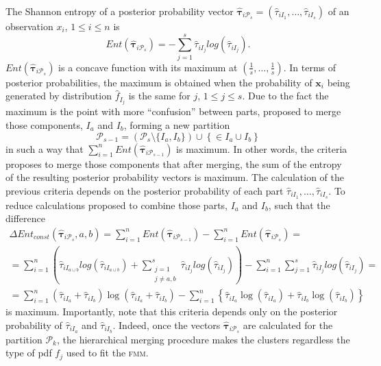 \documentclass[10pt, a4paper]{article}
\newcommand{\m}[1]{\boldsymbol{#1}}
\newcommand{\fmm}{\textsc{fmm}\xspace}
\begin{document}
\begin{spacing}{1.9}
The Shannon entropy of a posterior probability vector $\hat{\m\tau}_{i \mathcal{P}_s} = \left( \hat{\tau}_{i I_1} , \dots, \hat{\tau}_{i I_s}  \right)$ of an observation $x_i$, $1 \leq i \leq n$ is
\[
Ent( \hat{\m \tau}_{i \mathcal{P}_s} ) = - \sum_{j=1}^s \hat{\tau}_{i I_j}  log(\hat{\tau}_{i I_j} ).
\]
$Ent( \hat{\m \tau}_{i \mathcal{P}_s} )$ is a concave function with its maximum at $(\frac{1}{s},\dots,\frac{1}{s})$. In terms of posterior probabilities, the maximum is obtained when the probability of $\m x_i$ being generated by distribution $\hat{f}_{I_j}$ is the same for $j$, $1\leq j \leq s$. Due to the fact the maximum is the point with more ``confusion'' between parts, \cite{baudry2010combining} proposed to merge those components, $I_a$ and $I_b$, forming a new partition\[ \mathcal{P}_{s-1} = \left( \mathcal{P}_s \setminus \{ I_a, I_b \} \right) \cup \left\{ \in I_a\cup I_b \right\} \] in such a way that $\sum_{i=1}^n Ent( \hat{\m \tau}_{i \mathcal{P}_{s-1}} )$ is maximum. In other words, the criteria proposes to merge those components that after merging, the sum of the entropy of the resulting posterior probability vectors is maximum. The calculation of the previous criteria depends on the posterior probability of each part $\hat{\tau}_{i I_1}, \dots,\hat{\tau}_{i I_s}$. To reduce calculations \cite{baudry2010combining} proposed to combine those parts, $I_a$ and $I_b$, such that the difference
\begin{multline*}
\Delta Ent_{const}(\hat{\m \tau}_{i \mathcal{P}_s}, a, b) = \sum_{i=1}^n Ent( \hat{\m \tau}_{i \mathcal{P}_{s-1}}) - \sum_{i=1}^n Ent( \hat{\m \tau}_{i \mathcal{P}_s}) =  \\ = \sum_{i=1}^n  \left( \hat{\tau}_{i I_{a\cup b}}  log(\hat{\tau}_{i I_{a\cup b}} ) +  \sum_{\substack{j=1 \\
                                                            j \neq a, b}}^s \hat{\tau}_{i I_j}  log(\hat{\tau}_{i I_j} ) \right)  - \sum_{i=1}^n \sum_{j=1}^s \hat{\tau}_{i I_j}  log(\hat{\tau}_{i I_j} ) = \\  =   \sum_{i=1}^n  (\hat{\tau}_{i I_a}+\hat{\tau}_{i I_b}) \log(\hat{\tau}_{iI_a} + \hat{\tau}_{i I_b}) - \sum_{i=1}^n \left\{ \hat{\tau}_{i I_a} \log(\hat{\tau}_{i I_a}) + \hat{\tau}_{iI_b} \log(\hat{\tau}_{i I_b})\right\}
\end{multline*}
is maximum. Importantly, note that this criteria depends only on the posterior probability of $\hat{\tau}_{iI_a}$ and $\hat{\tau}_{iI_b}$. Indeed, once the vectors $\hat{\m\tau}_{i \mathcal{P}_s}$ are calculated for the partition $\mathcal{P}_k$, the hierarchical merging procedure makes the clusters regardless the type of pdf $f_j$ used to fit the \fmm.


\end{spacing}
\end{document}
